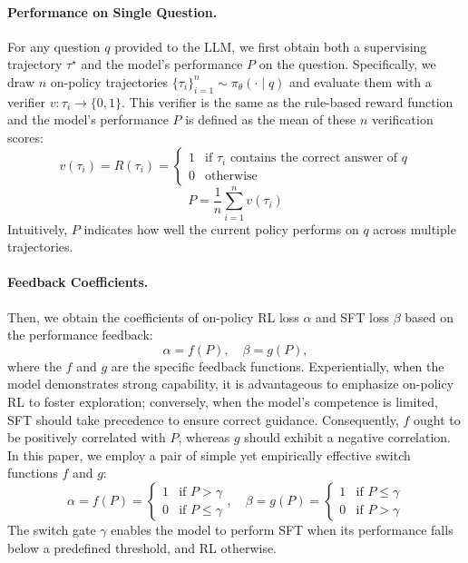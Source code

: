 \paragraph{Performance on Single Question.} 
For any question $q$ provided to the LLM, we first obtain both a supervising trajectory $\tau^\star$ and the model's performance $P$ on the question.
Specifically, we draw $n$ on-policy trajectories $\{\tau_i\}^n_{i=1} \sim \pi_{\theta}(\cdot\mid q)$ and evaluate them with a verifier $v:\tau_i\to\{0,1\}$. This verifier is the same as the rule-based reward function and the model's performance $P$ is defined as the mean of these $n$ verification scores:
\begin{equation}
\label{eq: compute r}
v(\tau_i) = R(\tau_i) =\begin{cases}
 1 & \text{if } \tau_i \text{ contains the correct answer of } q  \\
 0 & \text{otherwise}
\end{cases} 
\end{equation}
\begin{equation}
P = \frac{1}{n}\sum_{i=1}^n v(\tau_i)
\end{equation}
Intuitively, $P$ indicates how well the current policy performs on $q$ across multiple trajectories.

\paragraph{Feedback Coefficients.} Then, we obtain the coefficients of on-policy RL loss $\alpha$ and SFT loss $\beta$ based on the performance feedback:
\begin{equation}
\alpha = f(P), \quad \beta = g(P),
\end{equation}
where the $f$ and $g$ are the specific feedback functions.
Experientially, when the model demonstrates strong capability, it is advantageous to emphasize on-policy RL to foster exploration; conversely, when the model’s competence is limited, SFT should take precedence to ensure correct guidance. Consequently, $f$ ought to be positively correlated with $P$, whereas $g$ should exhibit a negative correlation. In this paper, we employ a pair of simple yet empirically effective switch functions $f$ and $g$:
\begin{equation}
\alpha = f(P) =\begin{cases}
 1 & \text{if } P>\gamma   \\
 0 & \text{if } P\leq\gamma 
\end{cases} , \quad
\beta = g(P) =\begin{cases}
 1 & \text{if } P\leq\gamma    \\
 0 & \text{if } P>\gamma  
\end{cases}
\end{equation}
The switch gate $\gamma$ enables the model to perform SFT when its performance falls below a predefined threshold, and RL otherwise.

